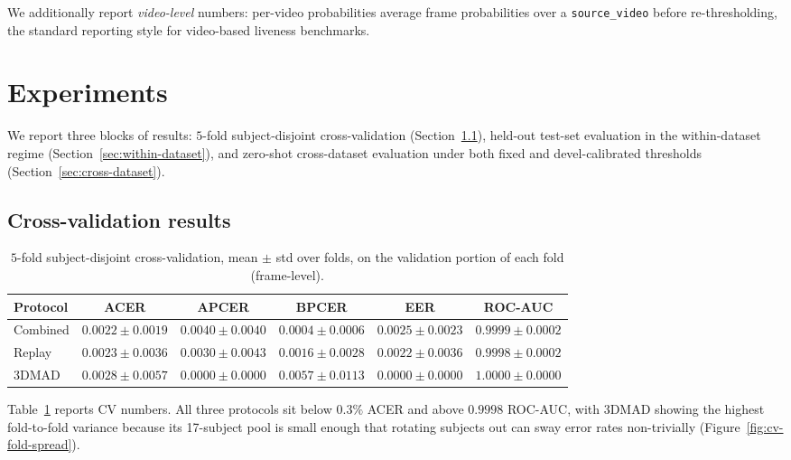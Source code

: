 \documentclass[anonymous, manuscript, screen, review]{acmart}
\begin{document}
We additionally report \emph{video-level} numbers: per-video
probabilities average frame probabilities over a \texttt{source\_video}
before re-thresholding, the standard reporting style for video-based
liveness benchmarks.

\section{Experiments}
\label{sec:experiments}

We report three blocks of results: $5$-fold subject-disjoint
cross-validation (Section~\ref{sec:cv}), held-out test-set evaluation
in the within-dataset regime (Section~\ref{sec:within-dataset}), and
zero-shot cross-dataset evaluation under both fixed and devel-calibrated
thresholds (Section~\ref{sec:cross-dataset}).

\subsection{Cross-validation results}
\label{sec:cv}

\begin{table}[htbp]
\centering
\caption{$5$-fold subject-disjoint cross-validation, mean $\pm$ std
over folds, on the validation portion of each fold (frame-level).}
\label{tab:cv}
\small
\begin{tabular}{l c c c c c}
\toprule
Protocol & ACER & APCER & BPCER & EER & ROC-AUC \\
\midrule
Combined & $0{.}0022\!\pm\!0{.}0019$ & $0{.}0040\!\pm\!0{.}0040$ & $0{.}0004\!\pm\!0{.}0006$ & $0{.}0025\!\pm\!0{.}0023$ & $0{.}9999\!\pm\!0{.}0002$ \\
Replay   & $0{.}0023\!\pm\!0{.}0036$ & $0{.}0030\!\pm\!0{.}0043$ & $0{.}0016\!\pm\!0{.}0028$ & $0{.}0022\!\pm\!0{.}0036$ & $0{.}9998\!\pm\!0{.}0002$ \\
3DMAD    & $0{.}0028\!\pm\!0{.}0057$ & $0{.}0000\!\pm\!0{.}0000$ & $0{.}0057\!\pm\!0{.}0113$ & $0{.}0000\!\pm\!0{.}0000$ & $1{.}0000\!\pm\!0{.}0000$ \\
\bottomrule
\end{tabular}
\end{table}

Table~\ref{tab:cv} reports CV numbers. All three protocols sit below
$0{.}3\%$ ACER and above $0{.}9998$ ROC-AUC, with 3DMAD showing the
highest fold-to-fold variance because its 17-subject pool is small
enough that rotating subjects out can sway error rates non-trivially
(Figure~\ref{fig:cv-fold-spread}).
\end{document}

